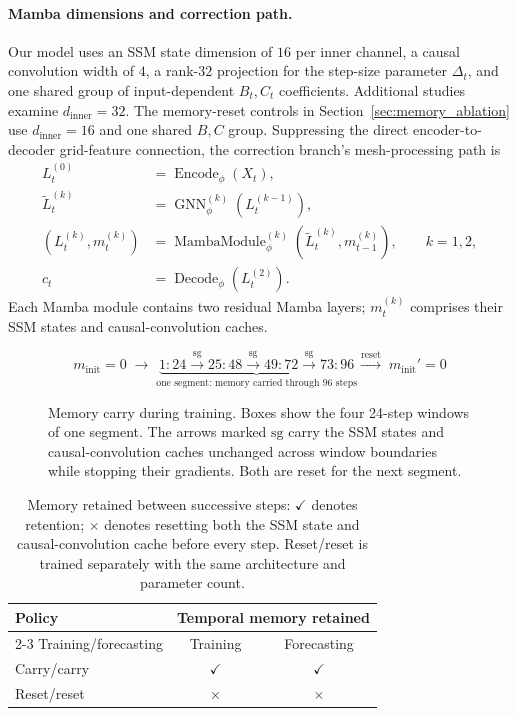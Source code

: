 \documentclass{article}
\begin{document}
\paragraph{Mamba dimensions and correction path.}
Our model uses an SSM state dimension of $16$ per inner channel, a causal convolution width of $4$, a rank-$32$ projection for the step-size parameter $\Delta_t$, and one shared group of input-dependent $B_t,C_t$ coefficients. Additional studies examine $d_{\mathrm{inner}}=32$. The memory-reset controls in Section~\ref{sec:memory_ablation} use $d_{\mathrm{inner}}=16$ and one shared $B,C$ group.
Suppressing the direct encoder-to-decoder grid-feature connection, the correction branch's mesh-processing path is
\begin{align}
    L_t^{(0)} &= \operatorname{Encode}_\phi(X_t),\\
    \widetilde{L}_t^{(k)} &= \operatorname{GNN}^{(k)}_\phi(L_t^{(k-1)}),\\
    (L_t^{(k)},m_t^{(k)})
    &=\operatorname{MambaModule}^{(k)}_\phi
       (\widetilde{L}_t^{(k)},m_{t-1}^{(k)}),\qquad k=1,2,\\
    c_t &= \operatorname{Decode}_\phi(L_t^{(2)}).
\end{align}
Each Mamba module contains two residual Mamba layers; $m_t^{(k)}$ comprises their SSM states and causal-convolution caches.

\begin{figure}[!htbp]
    \centering
    \normalsize
    \[
    m_{\mathrm{init}}=0\;\longrightarrow\;
    \underbrace{
      \boxed{1{:}24}
      \xrightarrow{\mathrm{sg}}\boxed{25{:}48}
      \xrightarrow{\mathrm{sg}}\boxed{49{:}72}
      \xrightarrow{\mathrm{sg}}\boxed{73{:}96}
    }_{\text{one segment: memory carried through 96 steps}}
    \xrightarrow{\mathrm{reset}}\;m_{\mathrm{init}}'=0
    \]
    \caption{Memory carry during training. Boxes show the four 24-step windows of one segment. The arrows marked $\mathrm{sg}$ carry the SSM states and causal-convolution caches unchanged across window boundaries while stopping their gradients. Both are reset for the next segment.}
    \label{fig:training_segments}
\end{figure}

\begin{table}[!htb]
    \centering
    \small
    \begin{tabular}{lcc}
        \toprule
        Policy & \multicolumn{2}{c}{Temporal memory retained} \\
        \cmidrule(lr){2-3}
        Training/forecasting & Training & Forecasting \\
        \midrule
        Carry/carry & $\checkmark$ & $\checkmark$ \\
        Reset/reset & $\times$ & $\times$ \\
        \bottomrule
    \end{tabular}
    \caption{Memory retained between successive steps: $\checkmark$ denotes retention; $\times$ denotes resetting both the SSM state and causal-convolution cache before every step. Reset/reset is trained separately with the same architecture and parameter count.}
    \label{tab:memory_controls}
\end{table}
\end{document}
